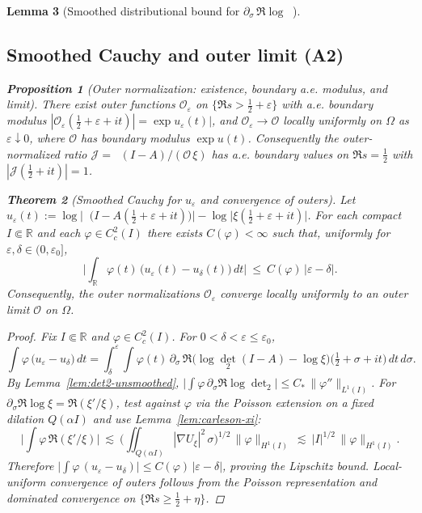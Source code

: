 \documentclass[11pt]{article}
\newtheorem{theorem}{Theorem}
\newtheorem{proposition}[theorem]{Proposition}
\newtheorem{lemma}[theorem]{Lemma}
\theoremstyle{definition}
\theoremstyle{remark}
\newcommand{\R}{\mathbb{R}}
\DeclareMathOperator{\dettwo}{det_2}
\begin{document}
\begin{lemma}[Smoothed distributional bound for $\partial_\sigma\,\Re\log\dettwo$]
\subsection*{Smoothed Cauchy and outer limit (A2)}
\begin{proposition}[Outer normalization: existence, boundary a.e. modulus, and limit]\label{prop:outer-central}
There exist outer functions \(\mathcal O_\varepsilon\) on \(\{\Re s>\tfrac12+\varepsilon\}\) with a.e. boundary modulus \(|\mathcal O_\varepsilon(\tfrac12+\varepsilon+it)|=\exp u_\varepsilon(t)|\), and \(\mathcal O_\varepsilon\to\mathcal O\) locally uniformly on \(\Omega\) as \(\varepsilon\downarrow 0\), where \(\mathcal O\) has boundary modulus \(\exp u(t)\). Consequently the outer-normalized ratio \(\mathcal J=\dettwo(I-A)/(\mathcal O\,\xi)\) has a.e. boundary values on \(\Re s=\tfrac12\) with \(|\mathcal J(\tfrac12+it)|=1\).
\end{proposition}
\begin{theorem}[Smoothed Cauchy for $u_\varepsilon$ and convergence of outers]\label{thm:unsmoothed-Cauchy}
Let $u_\varepsilon(t):=\log\Big|\dettwo\!\big(I\! -\!A(\tfrac12\!+\!\varepsilon\!+\!it)\big)\Big|\! -\!\log\big|\xi(\tfrac12\!+\!\varepsilon\!+\!it)\big|$. For each compact $I\Subset\R$ and each $\varphi\in C_c^2(I)$ there exists $C(\varphi)<\infty$ such that, uniformly for $\varepsilon,\delta\in(0,\varepsilon_0]$,
\[\Big|\int_{\R} \varphi(t)\,\big(u_\varepsilon(t)-u_\delta(t)\big)\,dt\Big|\ \le\ C(\varphi)\,|\varepsilon-\delta|.\]
Consequently, the outer normalizations $\mathcal O_\varepsilon$ converge locally uniformly to an outer limit $\mathcal O$ on $\Omega$.
\end{theorem}
\begin{proof}
Fix $I\Subset\R$ and $\varphi\in C_c^2(I)$. For $0<\delta<\varepsilon\le\varepsilon_0$,
\[\int \varphi\,\big(u_\varepsilon-u_\delta\big)\,dt = \int_\delta^{\varepsilon}\!\int \varphi(t)\,\partial_\sigma\,\Re\Big(\log\det_2(I-A)-\log\xi\Big)\big(\tfrac12+\sigma+it\big)\,dt\,d\sigma.\]
By Lemma~\ref{lem:det2-unsmoothed}, $\big|\int \varphi\,\partial_\sigma\Re\log\det_2\big|\le C_*\,\|\varphi''\|_{L^1(I)}$. For $\partial_\sigma\Re\log\xi=\Re(\xi'/\xi)$, test against $\varphi$ via the Poisson extension on a fixed dilation $Q(\alpha I)$ and use Lemma~\ref{lem:carleson-xi}:
\[\Big|\int \varphi\,\Re(\xi'/\xi)\Big|\ \lesssim\ \Big(\iint_{Q(\alpha I)} |\nabla U_\xi|^2\,\sigma\Big)^{1/2}\,\|\varphi\|_{H^1(I)}\ \lesssim\ |I|^{1/2}\,\|\varphi\|_{H^1(I)}.\]
Therefore $\big|\int \varphi\,(u_\varepsilon-u_\delta)\big|\le C(\varphi)\,|\varepsilon-\delta|$, proving the Lipschitz bound. Local-uniform convergence of outers follows from the Poisson representation and dominated convergence on $\{\Re s\ge\tfrac12+\eta\}$.
\end{proof}

\end{lemma}
\end{document}
